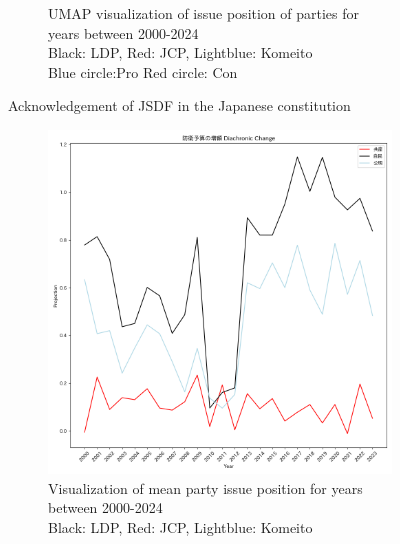 \documentclass[final,5p,times,twocolumn,authoryear]{elsarticle}
\begin{document}
\begin{figure}[h]
\begin{subfigure}{0.48\textwidth}
		  \caption{UMAP visualization of issue position of parties for years between 2000-2024 \\\hspace{\textwidth} 
		  Black: LDP, Red: JCP, Lightblue: Komeito\\\hspace{\textwidth}
		  Blue circle:Pro Red circle: Con}
		  \label{fig:sub2}
		\end{subfigure}
	\caption{Acknowledgement of JSDF in the Japanese constitution}
	\label{fig: results-diachronic-defence-constitution}
\end{figure}

\begin{figure}[h]
	\centering
		\begin{subfigure}{0.48\textwidth}
		  \centering
		  \includegraphics[width=\textwidth]{figs/results/diachronic_defence/防衛予算の増額_防衛_diachronic_change.png}
		  \caption{Visualization of mean party issue position for years between 2000-2024 \\\hspace{\textwidth} Black: LDP, Red: JCP, Lightblue: Komeito}
		  \label{fig:sub1}
		\end{subfigure}
		\hfill
		\begin{subfigure}{0.48\textwidth}
		  \centering

\end{subfigure}
\end{figure}
\end{document}
